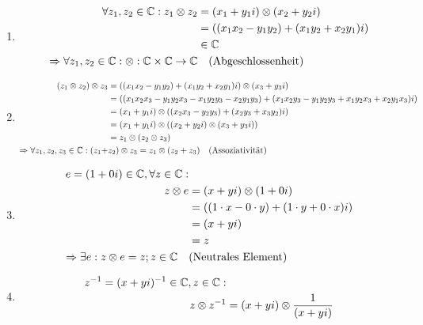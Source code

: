 \begin{Beweis}
		\begin{enumerate}[1)]
			\item \begin{align*}
						\forall z_1, z_2 \in \C: z_1 \otimes z_2 &\definedBy (x_1 + y_1i) \otimes (x_2 + y_2i) \\
														   		 &= ((x_1x_2 - y_1y_2) + (x_1y_2 + x_2y_1)i) \\
														   		 &\in \C \\
						\Rightarrow \forall z_1, z_2 \in \C: \otimes : \C \times \C \rightarrow \C & \quad \text{(Abgeschlossenheit)}
				  \end{align*}
			\item \begin{align*}
				  		(z_1 \otimes z_2) \otimes z_3 &= ((x_1x_2 - y_1y_2) + (x_1y_2 + x_2y_1)i) \otimes (x_3 + y_3i) \\
										  			  &= ((x_1x_2x_3 - y_1y_2x_3 - x_1y_2y_3 - x_2y_1y_3) + (x_1x_2y_3 - y_1y_2y_3 + x_1y_2x_3 + x_2y_1x_3)i) \\
												      &= (x_1 + y_1i) \otimes ((x_2x_3 - y_2y_3) + (x_2y_3 + x_3y_2)i) \\
												      &= (x_1 + y_1i) \otimes ((x_2 + y_2i) \otimes (x_3 + y_3i)) \\
												      &= z_1 \otimes (z_2 \otimes z_3) \\
						\Rightarrow \forall z_1, z_2, z_3 \in \mathbb{C}: (z_1 + &z_2) \otimes  z_3 = z_1 \otimes (z_2 + z_3) \quad \text{(Assoziativität)}
				  \end{align*}
			\item \begin{align*}
						e = (1 + 0i) \in \mathbb{C}, \forall z \in \mathbb{C}:& \\
												   z \otimes e &= (x + yi) \otimes (1 + 0i) \\
													  		   &= ((1 \cdot x - 0 \cdot y) + (1 \cdot y + 0 \cdot x)i) \\
															   &= (x + yi) \\
															   &= z \\
						\Rightarrow \exists e: z \otimes e = z; z \in \mathbb{C} \quad &\text{(Neutrales Element)}
				  \end{align*}
			\item \begin{align*}
	  					z^{-1} = (x + yi)^{-1} \in \C, z \in \C:& \\
								  z \otimes z^{-1} &= (x + yi) \otimes \dfrac{1}{(x + yi)} \\

\end{align*}
\end{enumerate}
\end{Beweis}
